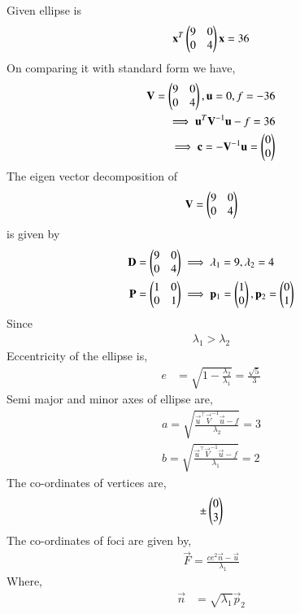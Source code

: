 %
Given ellipse is
\begin{align}
   \mathbf{x}^T\begin{pmatrix}9&0\\0&4\end{pmatrix}\mathbf{x}=36
\end{align}
%
On comparing it with standard form we have,
\begin{align}
    \mathbf{V}=\begin{pmatrix}9&0\\0&4\end{pmatrix},\mathbf{u}=0,f=-36\\
    \implies\mathbf{u}^T\mathbf{V}^{-1}\mathbf{u}-f = 36\\
    \implies\mathbf{c} = -\mathbf{V}^{-1}\mathbf{u} = \begin{pmatrix}0\\0\end{pmatrix}\\
\end{align}
The eigen vector decomposition of 
\begin{align}
    \mathbf{V} = \begin{pmatrix}9&0\\0&4\end{pmatrix}
\end{align}
is given by
\begin{align}
    \mathbf{D} &= \begin{pmatrix}9&0\\0&4\end{pmatrix} \implies \lambda_1 = 9,\lambda_2 = 4\\
    \mathbf{P} &= \begin{pmatrix}1&0\\0&1\end{pmatrix}\implies \mathbf{p}_1 = \begin{pmatrix}1\\0\end{pmatrix}, \mathbf{p}_2 = \begin{pmatrix}0\\1\end{pmatrix}
\end{align}
Since
\begin{align}
   \lambda_1 > \lambda_2
\end{align}
Eccentricity of the ellipse is,
\begin{align}
   e &= \sqrt{1-\frac{\lambda_2}{\lambda_1}}
   = \frac{\sqrt{5}}{3}
\end{align} 
Semi major and minor axes of ellipse are,
\begin{align}
    a = \sqrt{\frac{\vec{u}^{\top}\vec{V}^{-1}\vec{u}-f}{\lambda_2}} = 3\\ 
    b = \sqrt{\frac{\vec{u}^{\top}\vec{V}^{-1}\vec{u}-f}{\lambda_1}} = 2
\end{align}
The co-ordinates of vertices are,
\begin{align}
   \pm\begin{pmatrix}0 \\ 3\end{pmatrix} 
\end{align}
The co-ordinates of foci are given by,
\begin{align}
  \vec{F}  = \frac{ce^2\vec{n}-\vec{u}}{\lambda_1}
\end{align}
Where,
\begin{align}
    \vec{n} &= \sqrt{\lambda_1}\vec{p}_2
\end{align}
